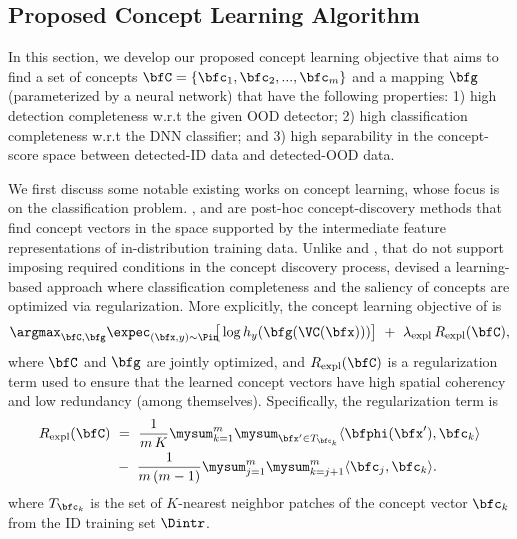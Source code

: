 \fi


\subsection{Proposed Concept Learning Algorithm}
\label{sec:concept_learning}

In this section, we develop our proposed concept learning objective that aims to find a set of concepts $\bfC = \{\bfc_1, \bfc_2, ..., \bfc_m\}$ and a mapping $\bfg$ (parameterized by a neural network) that have the following properties: 1) high detection completeness w.r.t the given OOD detector; 2) high classification completeness w.r.t the DNN classifier; and 3) high separability in the concept-score space between detected-ID data and detected-OOD data.

We first discuss some notable existing works on concept learning, whose focus is on the classification problem.
\citeauthor{kim2018tcav}, \citeauthor{ghorbani2019ace} and \citeauthor{yeh2019completeness} are post-hoc concept-discovery methods that find concept vectors in the space supported by the intermediate feature representations of in-distribution training data.
Unlike \cite{kim2018tcav} and \cite{ghorbani2019ace}, that do not support imposing required conditions in the concept discovery process, \cite{yeh2019completeness} devised a learning-based approach where classification completeness and the saliency of concepts are optimized via regularization.
More explicitly, the concept learning objective of \cite{yeh2019completeness} is
\begin{equation}
\label{equ: baseline}
    \argmax_{\bfC, \bfg} \expec_{(\bfx, y) \sim \Pin}\!\!\big[ \log h_y(\bfg(\VC(\bfx))) \big] ~+~ \lambda_{\textrm{expl}}\, R_{\textrm{expl}}(\bfC),
\end{equation}
where $\bfC$ and $\bfg$ are jointly optimized, and $R_{\textrm{expl}}(\bfC)$ is a regularization term used to ensure that the learned concept vectors have high spatial coherency and low redundancy (among themselves).
Specifically, the regularization term is
\begin{align}
\label{equ:regularizer_expl}
    R_{\textrm{expl}}(\bfC) ~&=~ \frac{1}{m\,K} \mysum_{k=1}^m \mysum_{\bfx^\prime \in T_{\bfc_k}} \langle \bfphi(\bfx^\prime), \bfc_k \rangle \nonumber \\
    &-~ \frac{1}{m \,(m - 1)} \mysum_{j=1}^m \mysum_{k=j + 1}^m \langle \bfc_j, \bfc_k \rangle.
\end{align}
where $T_{\bfc_k}$ is the set of $K$-nearest neighbor patches of the concept vector $\bfc_k$ from the ID training set $\Dintr$.


